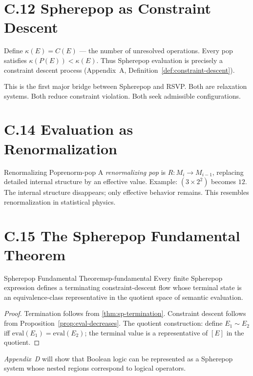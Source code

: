 \section*{C.12 Spherepop as Constraint Descent}

Define $\kappa(E) = C(E)$ — the number of unresolved operations. Every pop
satisfies $\kappa(P(E)) < \kappa(E)$. Thus Spherepop evaluation is precisely
a constraint descent process (Appendix~A, Definition~\ref{def:constraint-descent}).

\begin{remark}
  This is the first major bridge between Spherepop and RSVP. Both are
  relaxation systems. Both reduce constraint violation. Both seek admissible
  configurations.
\end{remark}

\section*{C.14 Evaluation as Renormalization}

\begin{definition}{Renormalizing Pop}{renorm-pop}
  A \emph{renormalizing pop} is $R : M_i \to M_{i-1}$, replacing detailed
  internal structure by an effective value. Example: $(3 \times 2^2)$
  becomes $12$. The internal structure disappears; only effective behavior
  remains. This resembles renormalization in statistical physics.
\end{definition}

\section*{C.15 The Spherepop Fundamental Theorem}

\begin{theorem}{Spherepop Fundamental Theorem}{sp-fundamental}
  Every finite Spherepop expression defines a terminating constraint-descent
  flow whose terminal state is an equivalence-class representative in the
  quotient space of semantic evaluation.
\end{theorem}

\begin{proof}
  Termination follows from \cref{thm:sp-termination}.
  Constraint descent follows from Proposition~\ref{prop:eval-decreases}.
  The quotient construction: define $E_1 \sim E_2$ iff
  $\mathrm{eval}(E_1) = \mathrm{eval}(E_2)$; the terminal value is
  a representative of $[E]$ in the quotient.
\end{proof}

\medskip
\noindent
\textit{Appendix~D} will show that Boolean logic can be represented as a
Spherepop system whose nested regions correspond to logical operators.
